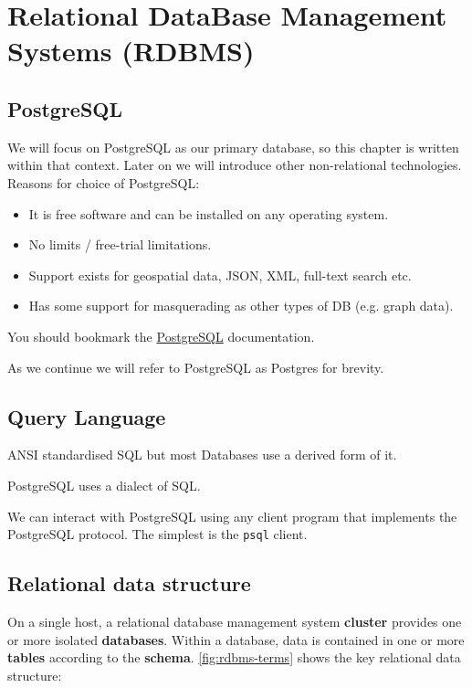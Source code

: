 \chapter{Relational DataBase Management Systems (RDBMS)}

\section{PostgreSQL}\label{sec:postgresql}

We will focus on PostgreSQL as our primary database, so this chapter is written within that context.
Later on we will introduce other non-relational technologies.
Reasons for choice of PostgreSQL:

\begin{itemize}
\item
  It is free software and can be installed on any operating system.
\item
  No limits / free-trial limitations.
\item
  Support exists for geospatial data, JSON, XML, full-text search etc.
\item
  Has some support for masquerading as other types of DB (e.g. graph data).
\end{itemize}

You should bookmark the
\href{https://www.postgresql.org/docs/13/}{PostgreSQL} documentation.

As we continue we will refer to PostgreSQL as Postgres for brevity.


\section{Query Language}

ANSI standardised SQL but most Databases use a derived form of it. 

PostgreSQL uses a dialect of SQL.

We can interact with PostgreSQL using any client program that implements the PostgreSQL protocol.
The simplest is the \texttt{psql} client. 


\section{Relational data structure}

On a single host, a relational database management system \textbf{cluster} provides one or more isolated \textbf{databases}.
Within a database, data is contained in one or more \textbf{tables} according to the \textbf{schema}.
\autoref{fig:rdbms-terms} shows the key relational data structure:

